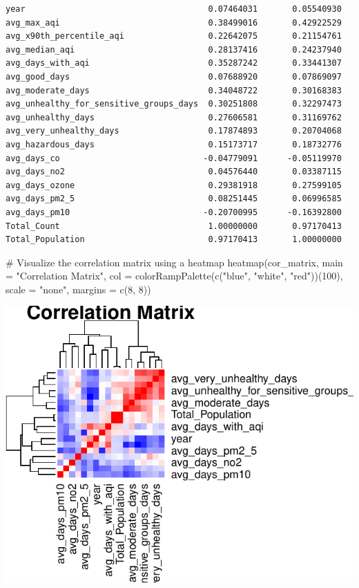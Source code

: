 \documentclass[
  12pt,
]{article}
\newenvironment{Shaded}{\begin{snugshade}}{\end{snugshade}}
\newcommand{\AttributeTok}[1]{\textcolor[rgb]{0.40,0.45,0.13}{#1}}
\newcommand{\CommentTok}[1]{\textcolor[rgb]{0.37,0.37,0.37}{#1}}
\newcommand{\DecValTok}[1]{\textcolor[rgb]{0.68,0.00,0.00}{#1}}
\newcommand{\FunctionTok}[1]{\textcolor[rgb]{0.28,0.35,0.67}{#1}}
\newcommand{\NormalTok}[1]{\textcolor[rgb]{0.00,0.23,0.31}{#1}}
\newcommand{\StringTok}[1]{\textcolor[rgb]{0.13,0.47,0.30}{#1}}
\begin{document}
\begin{verbatim}
year                                     0.07464031       0.05540930
avg_max_aqi                              0.38499016       0.42922529
avg_x90th_percentile_aqi                 0.22642075       0.21154761
avg_median_aqi                           0.28137416       0.24237940
avg_days_with_aqi                        0.35287242       0.33441307
avg_good_days                            0.07688920       0.07869097
avg_moderate_days                        0.34048722       0.30168383
avg_unhealthy_for_sensitive_groups_days  0.30251808       0.32297473
avg_unhealthy_days                       0.27606581       0.31169762
avg_very_unhealthy_days                  0.17874893       0.20704068
avg_hazardous_days                       0.15173717       0.18732776
avg_days_co                             -0.04779091      -0.05119970
avg_days_no2                             0.04576440       0.03387115
avg_days_ozone                           0.29381918       0.27599105
avg_days_pm2_5                           0.08251445       0.06996585
avg_days_pm10                           -0.20700995      -0.16392800
Total_Count                              1.00000000       0.97170413
Total_Population                         0.97170413       1.00000000
\end{verbatim}

\begin{Shaded}
\begin{Highlighting}[]
\CommentTok{\# Visualize the correlation matrix using a heatmap}
\FunctionTok{heatmap}\NormalTok{(cor\_matrix, }
        \AttributeTok{main =} \StringTok{"Correlation Matrix"}\NormalTok{, }
        \AttributeTok{col =} \FunctionTok{colorRampPalette}\NormalTok{(}\FunctionTok{c}\NormalTok{(}\StringTok{"blue"}\NormalTok{, }\StringTok{"white"}\NormalTok{, }\StringTok{"red"}\NormalTok{))(}\DecValTok{100}\NormalTok{), }
        \AttributeTok{scale =} \StringTok{"none"}\NormalTok{, }
        \AttributeTok{margins =} \FunctionTok{c}\NormalTok{(}\DecValTok{8}\NormalTok{, }\DecValTok{8}\NormalTok{))}
\end{Highlighting}
\end{Shaded}

\includegraphics{final_main_quarto_presentation_files/figure-pdf/unnamed-chunk-11-1.pdf}
\end{document}

